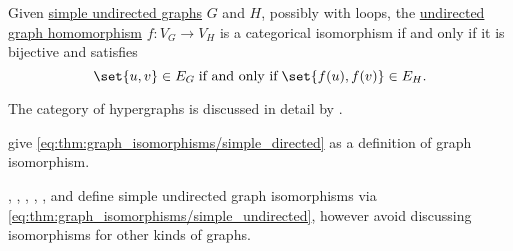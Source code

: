 \begin{proposition}
\begin{thmenum}
     Given \hyperref[def:undirected_graph]{simple undirected graphs} \( G \) and \( H \), possibly with loops, the \hyperref[def:undirected_graph/homomorphism]{undirected graph homomorphism} \( f: V_G \to V_H \) is a categorical isomorphism if and only if it is bijective and satisfies
    \begin{equation}\label{eq:thm:graph_isomorphisms/simple_undirected}
      \set{ u, v } \in E_G \T{if and only if} \set{ f(u), f(v) } \in E_H.
    \end{equation}
  \end{thmenum}
\end{proposition}
\begin{comments}
  \item The category of hypergraphs is discussed in detail by .

   give \eqref{eq:thm:graph_isomorphisms/simple_directed} as a definition of graph isomorphism.

  , , , , ,  and  define simple undirected graph isomorphisms via \eqref{eq:thm:graph_isomorphisms/simple_undirected}, however avoid discussing isomorphisms for other kinds of graphs.
\end{comments}
